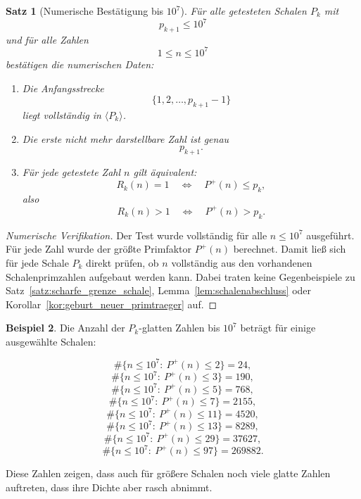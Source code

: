 \documentclass[11pt,a4paper]{article}
\newtheorem{satz}{Satz}
\theoremstyle{definition}
\newtheorem{beispiel}[satz]{Beispiel}
\theoremstyle{remark}
\begin{document}
	\begin{satz}[Numerische Bestätigung bis \(10^7\)]
		\label{satz:numerik_bis_10hoch7}
		Für alle getesteten Schalen \(P_k\) mit
		\[
		p_{k+1}\le 10^7
		\]
		und für alle Zahlen
		\[
		1\le n\le 10^7
		\]
		bestätigen die numerischen Daten:
		
		\begin{enumerate}
			\item Die Anfangsstrecke
			\[
			\{1,2,\dots,p_{k+1}-1\}
			\]
			liegt vollständig in \(\langle P_k\rangle\).
			
			\item Die erste nicht mehr darstellbare Zahl ist genau
			\[
			p_{k+1}.
			\]
			
			\item Für jede getestete Zahl \(n\) gilt äquivalent:
			\[
			R_k(n)=1
			\quad\Longleftrightarrow\quad
			P^+(n)\le p_k,
			\]
			also
			\[
			R_k(n)>1
			\quad\Longleftrightarrow\quad
			P^+(n)>p_k.
			\]
		\end{enumerate}
	\end{satz}
	
	\begin{proof}[Numerische Verifikation]
		Der Test wurde vollständig für alle \(n\le 10^7\) ausgeführt. Für jede Zahl wurde der
		größte Primfaktor \(P^+(n)\) berechnet. Damit ließ sich für jede Schale \(P_k\) direkt
		prüfen, ob \(n\) vollständig aus den vorhandenen Schalenprimzahlen aufgebaut werden kann.
		Dabei traten keine Gegenbeispiele zu Satz~\ref{satz:scharfe_grenze_schale},
		Lemma~\ref{lem:schalenabschluss} oder Korollar~\ref{kor:geburt_neuer_primtraeger} auf.
	\end{proof}
	
	\begin{beispiel}
		Die Anzahl der \(P_k\)-glatten Zahlen bis \(10^7\) beträgt für einige ausgewählte Schalen:
		
		\[
		\#\{n\le 10^7:\ P^+(n)\le 2\}=24,
		\]
		\[
		\#\{n\le 10^7:\ P^+(n)\le 3\}=190,
		\]
		\[
		\#\{n\le 10^7:\ P^+(n)\le 5\}=768,
		\]
		\[
		\#\{n\le 10^7:\ P^+(n)\le 7\}=2155,
		\]
		\[
		\#\{n\le 10^7:\ P^+(n)\le 11\}=4520,
		\]
		\[
		\#\{n\le 10^7:\ P^+(n)\le 13\}=8289,
		\]
		\[
		\#\{n\le 10^7:\ P^+(n)\le 29\}=37627,
		\]
		\[
		\#\{n\le 10^7:\ P^+(n)\le 97\}=269882.
		\]
		
		Diese Zahlen zeigen, dass auch für größere Schalen noch viele glatte Zahlen auftreten,
		dass ihre Dichte aber rasch abnimmt.
	\end{beispiel}
	
\end{document}
